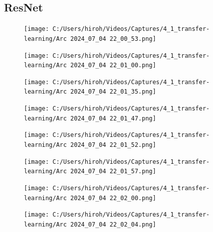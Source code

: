 \documentclass{ltjsarticle}
\begin{document}
\subsection{ResNet}
\begin{figure}[htbp]
  \centering
  \texttt{[image: C:/Users/hiroh/Videos/Captures/4\_1\_transfer-learning/Arc 2024\_07\_04 22\_00\_53.png]}
\end{figure}
\begin{figure}[htbp]
  \centering
  \texttt{[image: C:/Users/hiroh/Videos/Captures/4\_1\_transfer-learning/Arc 2024\_07\_04 22\_01\_00.png]}
\end{figure}
\begin{figure}[htbp]
  \centering
  \texttt{[image: C:/Users/hiroh/Videos/Captures/4\_1\_transfer-learning/Arc 2024\_07\_04 22\_01\_35.png]}
\end{figure}
\begin{figure}[htbp]
  \centering
  \texttt{[image: C:/Users/hiroh/Videos/Captures/4\_1\_transfer-learning/Arc 2024\_07\_04 22\_01\_47.png]}
\end{figure}
\begin{figure}[htbp]
  \centering
  \texttt{[image: C:/Users/hiroh/Videos/Captures/4\_1\_transfer-learning/Arc 2024\_07\_04 22\_01\_52.png]}
\end{figure}
\begin{figure}[htbp]
  \centering
  \texttt{[image: C:/Users/hiroh/Videos/Captures/4\_1\_transfer-learning/Arc 2024\_07\_04 22\_01\_57.png]}
\end{figure}
\begin{figure}[htbp]
  \centering
  \texttt{[image: C:/Users/hiroh/Videos/Captures/4\_1\_transfer-learning/Arc 2024\_07\_04 22\_02\_00.png]}
\end{figure}
\begin{figure}[htbp]
  \centering
  \texttt{[image: C:/Users/hiroh/Videos/Captures/4\_1\_transfer-learning/Arc 2024\_07\_04 22\_02\_04.png]}
\end{figure}

\clearpage
\end{document}
